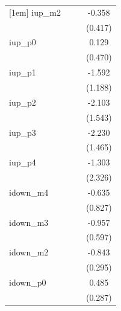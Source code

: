 \begin{table}[htbp]
\begin{tabular}{l*{3}{c}}
[1em]
iup\_m2              &                     &                     &      -0.358         \\
                    &                     &                     &     (0.417)         \\
[1em]
iup\_p0              &                     &                     &       0.129         \\
                    &                     &                     &     (0.470)         \\
[1em]
iup\_p1              &                     &                     &      -1.592         \\
                    &                     &                     &     (1.188)         \\
[1em]
iup\_p2              &                     &                     &      -2.103         \\
                    &                     &                     &     (1.543)         \\
[1em]
iup\_p3              &                     &                     &      -2.230         \\
                    &                     &                     &     (1.465)         \\
[1em]
iup\_p4              &                     &                     &      -1.303         \\
                    &                     &                     &     (2.326)         \\
[1em]
idown\_m4            &                     &                     &      -0.635         \\
                    &                     &                     &     (0.827)         \\
[1em]
idown\_m3            &                     &                     &      -0.957         \\
                    &                     &                     &     (0.597)         \\
[1em]
idown\_m2            &                     &                     &      -0.843\sym{***}\\
                    &                     &                     &     (0.295)         \\
[1em]
idown\_p0            &                     &                     &       0.485\sym{*}  \\
                    &                     &                     &     (0.287)         \\

\end{tabular}
\end{table}
